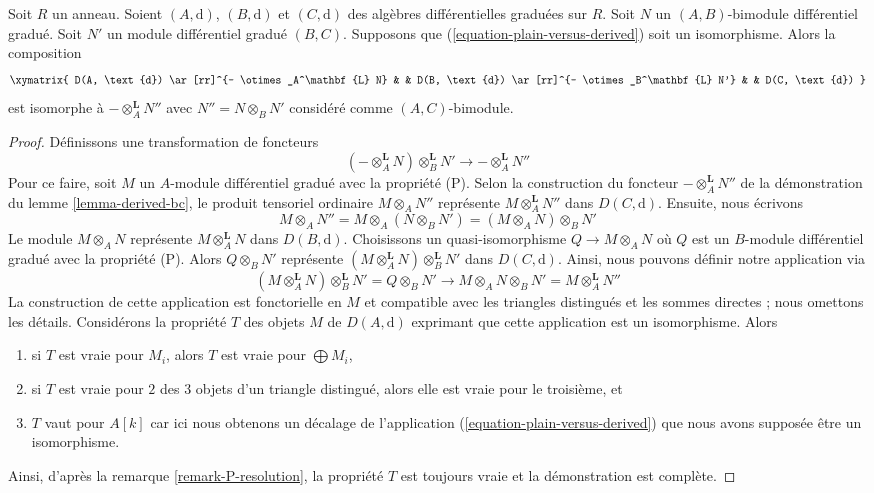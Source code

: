 \begin{lemma}
\label{lemma-compose-tensor-functors-general}
Soit $R$ un anneau. Soient $(A, \text{d})$, $(B, \text{d})$ et
$(C, \text{d})$ des algèbres différentielles graduées sur
$R$. Soit $N$ un $(A, B)$-bimodule différentiel gradué.
Soit $N'$ un module différentiel gradué $(B, C)$.
Supposons que (\ref{equation-plain-versus-derived}) soit un isomorphisme.
Alors la composition
$$
\xymatrix{
D(A, \text{d}) \ar[rr]^{- \otimes_A^\mathbf{L} N} & &
D(B, \text{d}) \ar[rr]^{- \otimes_B^\mathbf{L} N'} & &
D(C, \text{d})
}
$$
est isomorphe à $- \otimes_A^\mathbf{L} N''$ avec
$N'' = N \otimes_B N'$ considéré comme $(A, C)$-bimodule.
\end{lemma}

\begin{proof}
Définissons une transformation de foncteurs
$$
(- \otimes_A^\mathbf{L} N) \otimes_B^\mathbf{L} N'
\longrightarrow
- \otimes_A^\mathbf{L} N''
$$
Pour ce faire,
soit $M$ un $A$-module différentiel gradué avec la propriété
(P). Selon la construction du foncteur $- \otimes_A^\mathbf{L} N''$ de la
démonstration du lemme \ref{lemma-derived-bc}, le produit tensoriel
ordinaire $M \otimes_A N''$ représente $M \otimes_A^\mathbf{L} N''$ dans $D(C,
\text{d})$. Ensuite, nous écrivons
$$
M \otimes_A N'' =
M \otimes_A (N \otimes_B N') =
(M \otimes_A N) \otimes_B N'
$$
Le module $M \otimes_A N$ représente $M \otimes_A^\mathbf{L} N$ dans
$D(B, \text{d})$. Choisissons un quasi-isomorphisme $Q \to M \otimes_A N$ où $Q$
est un $B$-module différentiel gradué avec la propriété (P). Alors $Q
\otimes_B N'$ représente $(M
\otimes_A^\mathbf{L} N) \otimes_B^\mathbf{L} N'$ dans $D(C, \text{d})$.
Ainsi, nous pouvons
définir notre application via
$$
(M \otimes_A^\mathbf{L} N) \otimes_B^\mathbf{L} N' =
Q \otimes_B N' \to
M \otimes_A N \otimes_B N' = M
\otimes_A^\mathbf{L} N''
$$
La construction de cette application est fonctorielle en $M$ et compatible
avec les triangles distingués et les sommes directes ; nous omettons les
détails. Considérons la propriété $T$ des objets $M$ de $D(A, \text{d})$
exprimant que cette application est un isomorphisme. Alors
\begin{enumerate}
\item si $T$ est vraie pour $M_i$, alors $T$ est vraie pour $\bigoplus M_i$,
\item si $T$ est vraie pour $2$ des $3$ objets d'un triangle
distingué, alors elle est vraie pour le troisième, et
\item $T$ vaut pour $A[k]$ car ici nous obtenons un décalage de
l'application (\ref{equation-plain-versus-derived}) que nous
avons supposée être un isomorphisme.
\end{enumerate}
Ainsi, d'après la remarque \ref{remark-P-resolution}, la propriété $T$
est toujours vraie et la démonstration est complète.
\end{proof}

